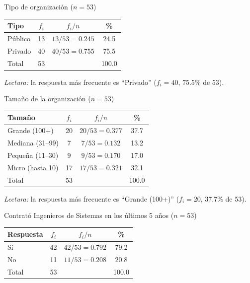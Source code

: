 \begin{mitabla}{Tipo de organización ($n=53$)}
\begin{tabular}{lccc}
\toprule
Tipo & $f_i$ & $f_i / n$ & \% \\
\midrule
Público & 13 & $13/53 = 0.245$ & 24.5 \\
Privado & 40 & $40/53 = 0.755$ & 75.5 \\
\midrule
Total & 53 & & 100.0 \\
\bottomrule
\end{tabular}
\end{mitabla}

\textit{Lectura:} la respuesta más frecuente es ``Privado'' ($f_i = 40$, 75.5\% de 53).

\begin{mitabla}{Tamaño de la organización ($n=53$)}
\begin{tabular}{lccc}
\toprule
Tamaño & $f_i$ & $f_i / n$ & \% \\
\midrule
Grande (100+) & 20 & $20/53 = 0.377$ & 37.7 \\
Mediana (31–99) & 7 & $7/53 = 0.132$ & 13.2 \\
Pequeña (11–30) & 9 & $9/53 = 0.170$ & 17.0 \\
Micro (hasta 10) & 17 & $17/53 = 0.321$ & 32.1 \\
\midrule
Total & 53 & & 100.0 \\
\bottomrule
\end{tabular}
\end{mitabla}

\textit{Lectura:} la respuesta más frecuente es ``Grande (100+)'' ($f_i = 20$, 37.7\% de 53).

\begin{mitabla}{Contrató Ingenieros de Sistemas en los últimos 5 años ($n=53$)}
\begin{tabular}{lccc}
\toprule
Respuesta & $f_i$ & $f_i / n$ & \% \\
\midrule
Sí & 42 & $42/53 = 0.792$ & 79.2 \\
No & 11 & $11/53 = 0.208$ & 20.8 \\
\midrule
Total & 53 & & 100.0 \\
\bottomrule
\end{tabular}
\end{mitabla}

